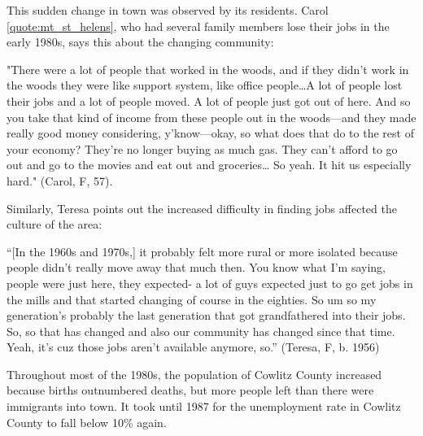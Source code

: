 This sudden change in town was observed by its residents. Carol \ref{quote:mt_st_helens}, who had several family members lose their jobs in the early 1980s, says this about the changing community:
\begin{num_quote}
    "There were a lot of people that worked in the woods, and if they didn't work in the woods they were like support system, like office people\ldots A lot of people lost their jobs and a lot of people moved. A lot of people just got out of here. And so you take that kind of income from these people out in the woods—and they made really good money considering, y'know—okay, so what does that do to the rest of your economy? They're no longer buying as much gas. They can't afford to go out and go to the movies and eat out and groceries… So yeah. It hit us especially hard." (Carol, F, 57).
\label{quote:mt_st_helens}
\end{num_quote}
Similarly, Teresa points out the increased difficulty in finding jobs affected the culture of the area:
\begin{num_quote}
    ``[In the 1960s and 1970s,] it probably felt more rural or more isolated because people didn't really move away that much then. You know what I'm saying, people were just here, they expected- a lot of guys expected just to go get jobs in the mills and that started changing of course in the eighties. So um so my generation's probably the last generation that got grandfathered into their jobs. So, so that has changed and also our community has changed since that time. Yeah, it's cuz those jobs aren't available anymore, so.'' (Teresa, F, b. 1956)
\label{quote:changed_culture}
\end{num_quote}
Throughout most of the 1980s, the population of Cowlitz County increased because births outnumbered deaths, but more people left than there were immigrants into town. It took until 1987 for the unemployment rate in Cowlitz County to fall below 10\% again.

